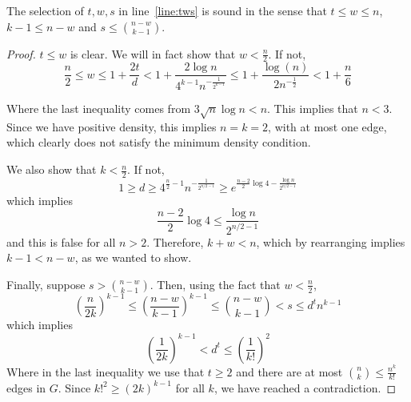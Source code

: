\begin{lemma}\label{lm:sound}
    The selection of $t, w, s$ in line~\ref{line:tws} is sound in the sense that
    $t  \leq w \leq n$, $k - 1 \leq n - w$ and $s \leq \binom{n - w}{k - 1}$.
    \begin{proof}
        $t \leq w$ is clear.
        We will in fact show that $w < \frac{n}{2}$.
        If not,
        \[
            \frac{n}{2} \leq
            w \leq 1 + \frac{2t}{d} <
            1 + \frac{2 \log n}{4^{k-1} n^{-\frac{1}{2^{k-1}}}} \leq
            1 + \frac{\log(n)}{2 n^{-\frac{1}{2}}} <
            1 + \frac{n}{6}
        \]

        Where the last inequality comes from $3 \sqrt {n} \log n < n$.
        This implies that $n < 3$.
        Since we have positive density, this implies $n = k = 2$,
        with at most one edge, which clearly
        does not satisfy the minimum density condition.

        We also show that $k < \frac{n}{2}$.
        If not,
        \[
            1 \geq
            d \geq
            4^{\frac{n}{2}-1} n^{-\frac{1}{2^{n/2-1}}} \geq
            e^{\frac{n-2}{2} \log 4 - \frac{\log n}{2^{n/2-1}}}
        \]
        which implies
        \[
            \frac{n-2}{2} \log 4 \leq \frac{\log n}{2^{n/2-1}}
        \]
        and this is false for all $n > 2$.
        Therefore, $ k + w < n$, which by rearranging implies $k - 1 < n - w$,
        as we wanted to show.

        Finally, suppose $s > \binom{n - w}{k - 1}$.
        Then, using the fact that $w < \frac{n}{2}$,
        \[
            \left( \frac{n}{2k} \right)^{k-1} \leq
            \left( \frac{n-w}{k-1} \right)^{k-1} \leq
            \binom{n - w}{k - 1} < s \leq d^t n^{k-1}
        \]
        which implies
        \[
            \left( \frac{1}{2k} \right)^{k-1} < d^t \leq
            \left( \frac{1}{k!} \right)^2
        \]
        Where in the last inequality we use that $t \geq 2$ and there are at most
        $\binom{n}{k} \leq \frac{n^k}{k!}$ edges in $G$.
        Since $k!^2 \geq (2k)^{k-1}$ for all $k$,
        we have reached a contradiction. \qedhere

    \end{proof}
\end{lemma}

